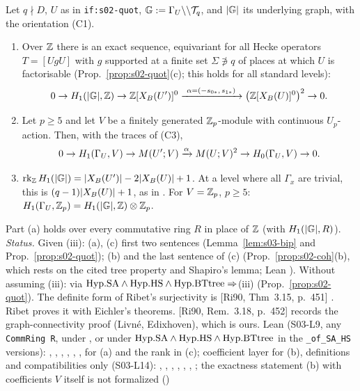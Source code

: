 \begin{theorem}\label{thm:s03-ribet}
Let $q\nmid D$, $U$ as in \texttt{if:s02-quot}, $\mathbb{G}:=\Gamma_U\backslash\backslash\mathcal{T}_q$, and $|\mathbb{G}|$ its underlying graph, with the orientation (C1).
\begin{enumerate}[label=(\alph*)]
\item Over $\mathbb{Z}$ there is an exact sequence, equivariant for all Hecke operators $T=[UgU]$ with $g$ supported at a finite set $\Sigma\not\ni q$ of
  places at which $U$ is factorisable (Prop.~\ref{prop:s02-quot}(c); this holds for all standard levels):
  \[0\to H_1(|\G|,\Z)\to\Z[\XB{U'}]^0\xrightarrow{\ \alpha=(-s_{0*},\,s_{1*})\ }\big(\Z[\XB U]^0\big)^{2}\to0.\]
\item Let $p\ge5$ and let $V$ be a finitely generated $\mathbb{Z}_p$-module with continuous $U_p$-action. Then, with the traces of (C3),
  \[0\to H_1(\Gamma_U,V)\to M(U';V)\xrightarrow{\alpha}M(U;V)^{2}\to H_0(\Gamma_U,V)\to0.\]
\item $\operatorname{rk}_{\mathbb{Z}} H_1(|\mathbb{G}|)=|X_B(U')|-2|X_B(U)|+1$. At a level where all $\Gamma_x$ are trivial, this is $(q-1)|X_B(U)|+1$, as in
  . For $V=\mathbb{Z}_p$, $p\ge5$: $H_1(\Gamma_U,\mathbb{Z}_p)=H_1(|\mathbb{G}|,\mathbb{Z})\otimes\mathbb{Z}_p$.
\end{enumerate}
Part (a) holds over every commutative ring $R$ in place of $\mathbb{Z}$ (with $H_1(|\mathbb{G}|,R)$).
\emph{Status.} Given (iii): (a), (c) first two sentences \stproved{} (Lemma~\ref{lem:s03-bip} and Prop.~\ref{prop:s02-quot}); (b) and the last
sentence of (c) \stpmc{} (Prop.~\ref{prop:s02-coh}(b), which rests on the cited tree property and Shapiro's lemma; Lean ). Without
assuming (iii): \stpmc{} via $\mathrm{Hyp.SA}\wedge\mathrm{Hyp.HS}\wedge\mathrm{Hyp.BTtree}\Rightarrow$(iii) (Prop.~\ref{prop:s02-quot}). The definite form of Ribet's
surjectivity is [Ri90, Thm~3.15, p.~451]
 \stcited. Ribet proves it with Eichler's
theorems. [Ri90, Rem.~3.18, p.~452]
 records the graph-connectivity
proof (Livn\'e, Edixhoven), which is ours. Lean (S03-L9, any \texttt{CommRing R}, under , or under $\mathrm{Hyp.SA}\wedge\mathrm{Hyp.HS}\wedge\mathrm{Hyp.BTtree}$ in the \texttt{\_of\_SA\_HS} versions): , , , , , ,  \stformal{} for (a) and the rank in (c);
coefficient layer for (b), definitions and compatibilities only (S03-L14): , ,
, , , ,
 \stformal{}; the exactness statement (b) with coefficients $V$ itself is not formalized (\leanplanned)
\end{theorem}

